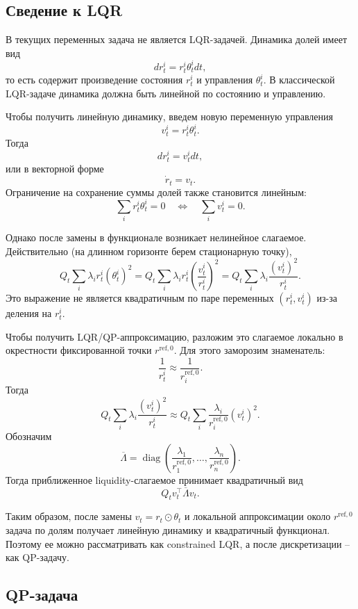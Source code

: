 \documentclass[12pt,a4paper]{article}
\begin{document}
\subsection{Сведение к LQR}

В текущих переменных задача не является LQR-задачей. Динамика долей имеет вид
\[
    dr_t^i = r_t^i\theta_t^i dt,
\]
то есть содержит произведение состояния $r_t^i$ и управления $\theta_t^i$. В классической LQR-задаче динамика должна быть линейной по состоянию и управлению.

Чтобы получить линейную динамику, введем новую переменную управления
\[
    v_t^i = r_t^i\theta_t^i.
\]
Тогда
\[
    dr_t^i = v_t^i dt,
\]
или в векторной форме
\[
    \dot r_t = v_t.
\]
Ограничение на сохранение суммы долей также становится линейным:
\[
    \sum_i r_t^i\theta_t^i = 0
    \quad \Longleftrightarrow \quad
    \sum_i v_t^i = 0.
\]

Однако после замены в функционале возникает нелинейное слагаемое. Действительно (на длинном горизонте берем стационарную точку),
\[
    Q_t\sum_i \lambda_i r_t^i(\theta_t^i)^2
    =
    Q_t\sum_i \lambda_i r_t^i
    \left(\frac{v_t^i}{r_t^i}\right)^2
    =
    Q_t\sum_i \lambda_i\frac{(v_t^i)^2}{r_t^i}.
\]
Это выражение не является квадратичным по паре переменных $(r_t^i,v_t^i)$ из-за деления на $r_t^i$.

Чтобы получить LQR/QP-аппроксимацию, разложим это слагаемое локально в окрестности фиксированной точки $r^{\mathrm{ref},0}$. Для этого заморозим знаменатель:
\[
    \frac{1}{r_t^i}
    \approx
    \frac{1}{r_i^{\mathrm{ref},0}}.
\]
Тогда
\[
    Q_t\sum_i \lambda_i\frac{(v_t^i)^2}{r_t^i}
    \approx
    Q_t\sum_i
    \frac{\lambda_i}{r_i^{\mathrm{ref},0}}
    (v_t^i)^2.
\]
Обозначим
\[
    \overline{\Lambda}
    =
    \operatorname{diag}
    \left(
        \frac{\lambda_1}{r_1^{\mathrm{ref},0}},
        \dots,
        \frac{\lambda_n}{r_n^{\mathrm{ref},0}}
    \right).
\]
Тогда приближенное liquidity-слагаемое принимает квадратичный вид
\[
    Q_t v_t^\top \overline{\Lambda} v_t.
\]

Таким образом, после замены $v_t=r_t\odot\theta_t$ и локальной аппроксимации около $r^{\mathrm{ref},0}$ задача по долям получает линейную динамику и квадратичный функционал. Поэтому ее можно рассматривать как constrained LQR, а после дискретизации -- как QP-задачу.

\subsection{QP-задача}
\end{document}

